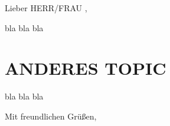 \documentclass%
  [fontsize=11pt,
   parskip=half,%
   fromalign=right,%
   fromphone=on,%
   fromemail=on,%
   fromurl=off,%
   fromrule=aftername,%
   fromemail=on,%
   locfield=wide,
   sections
]{scrlttr2}
\begin{document}

\begin{letter}{
  \toaddress
}


\opening{Lieber HERR/FRAU \tolastname,}

bla bla bla


\vspace*{-0.1cm}
\section*{ANDERES TOPIC}
bla bla bla\\

\closing{Mit freundlichen Grüßen,}

\end{letter}
\end{document}
